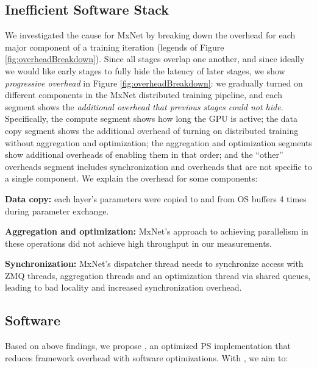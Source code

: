 \subsection{Inefficient Software Stack}

We investigated the cause for MxNet by breaking down the overhead for each major component of a training iteration (legends of Figure \ref{fig:overheadBreakdown}). Since all stages overlap one another, and since ideally we would like early stages to fully hide the latency of later stages, we show \textit{progressive overhead} in Figure \ref{fig:overheadBreakdown}: we gradually turned on different components in the MxNet distributed training pipeline, and each segment shows the \textit{additional overhead that previous stages could not hide}. Specifically, the compute segment shows how long the GPU is active; the data copy segment shows the additional overhead of turning on distributed training without aggregation and optimization; the aggregation and optimization segments show additional overheads of enabling them in that order; and the ``other'' overheads segment includes synchronization and overheads that are not specific to a single component. We explain the overhead for some components:

	\noindent\textbf{Data copy:} each layer's parameters were copied to and from OS buffers 4 times during parameter exchange.
\vspace{-0.1ex}	

	\noindent \textbf{Aggregation and optimization:} MxNet's approach to achieving parallelism in these operations did not achieve high throughput in our measurements.
\vspace{-0.1ex}	
	
	\noindent \textbf{Synchronization:} MxNet's dispatcher thread needs to synchronize access with ZMQ threads, aggregation threads and an optimization thread via shared queues, leading to bad locality and increased synchronization overhead. 
	
	
\subsection{\phub Software}
Based on above findings, we propose \phub, an optimized PS implementation that reduces framework overhead with software optimizations. With \phub, we aim to:


